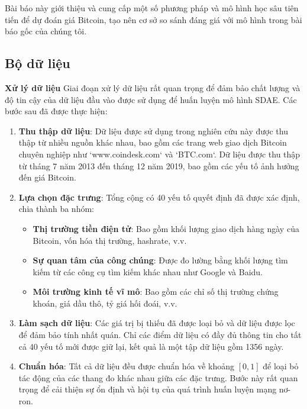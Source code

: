 Bài báo này giới thiệu và cung cấp một số phương pháp và mô hình học sâu tiên tiến để dự đoán giá Bitcoin, tạo nên cơ sở so sánh đáng giá với mô hình trong bài báo gốc của chúng tôi.
\subsection{Bộ dữ liệu}
\textbf{Xử lý dữ liệu}
Giai đoạn xử lý dữ liệu rất quan trọng để đảm bảo chất lượng và độ tin cậy của dữ liệu đầu vào được sử dụng để huấn luyện mô hình SDAE. Các bước sau đã được thực hiện:

\begin{enumerate}
    \item \textbf{Thu thập dữ liệu}: Dữ liệu được sử dụng trong nghiên cứu này được thu thập từ nhiều nguồn khác nhau, bao gồm các trang web giao dịch Bitcoin chuyên nghiệp như `www.coindesk.com` và `BTC.com`. Dữ liệu được thu thập từ tháng 7 năm 2013 đến tháng 12 năm 2019, bao gồm các yếu tố ảnh hưởng đến giá Bitcoin.
    
    \item \textbf{Lựa chọn đặc trưng}: Tổng cộng có 40 yếu tố quyết định đã được xác định, chia thành ba nhóm:
    \begin{itemize}
        \item \textbf{Thị trường tiền điện tử}: Bao gồm khối lượng giao dịch hàng ngày của Bitcoin, vốn hóa thị trường, hashrate, v.v.
        \item \textbf{Sự quan tâm của công chúng}: Được đo lường bằng khối lượng tìm kiếm từ các công cụ tìm kiếm khác nhau như Google và Baidu.
        \item \textbf{Môi trường kinh tế vĩ mô}: Bao gồm các chỉ số thị trường chứng khoán, giá dầu thô, tỷ giá hối đoái, v.v.
    \end{itemize}
    
    \item \textbf{Làm sạch dữ liệu}: Các giá trị bị thiếu đã được loại bỏ và dữ liệu được lọc để đảm bảo tính nhất quán. Chỉ các điểm dữ liệu có đầy đủ thông tin cho tất cả 40 yếu tố mới được giữ lại, kết quả là một tập dữ liệu gồm 1356 ngày.
    
    \item \textbf{Chuẩn hóa}: Tất cả dữ liệu đều được chuẩn hóa về khoảng $[0, 1]$ để loại bỏ tác động của các thang đo khác nhau giữa các đặc trưng. Bước này rất quan trọng để cải thiện sự ổn định và hội tụ của quá trình huấn luyện mạng nơ-ron.
\end{enumerate}

